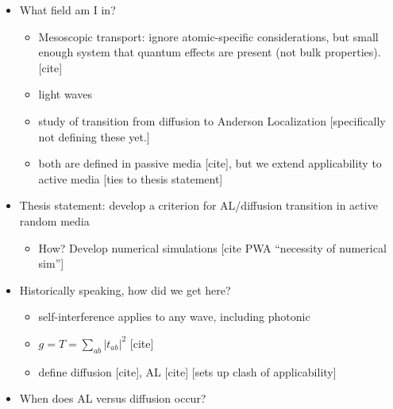 \documentclass[pdftex]{article}
\begin{document}
\begin{itemize}
 \item What field am I in?
 \begin{itemize}
  \item Mesoscopic transport: ignore atomic-specific considerations, but small enough system that quantum effects are present (not bulk properties).  [cite]
  \item light waves%
  \item study of transition from diffusion to Anderson Localization [specifically not defining these yet.]
  \item both are defined in passive media [cite], but we extend applicability to active media [ties to thesis statement]
 \end{itemize}
 \item Thesis statement: develop a criterion for AL/diffusion transition in active random media
 \begin{itemize}
  \item How? Develop numerical simulations  [cite PWA ``necessity of numerical sim'']
 \end{itemize}
 \item Historically speaking, how did we get here?
 \begin{itemize}
  \item self-interference applies to any wave, including photonic
  \item $g=T=\sum_{ab} |t_{ab}|^2$ [cite]
  \item define diffusion [cite], AL [cite] [sets up clash of applicability]
 \end{itemize}
 \item When does AL versus diffusion occur?

\end{itemize}
\end{document}
